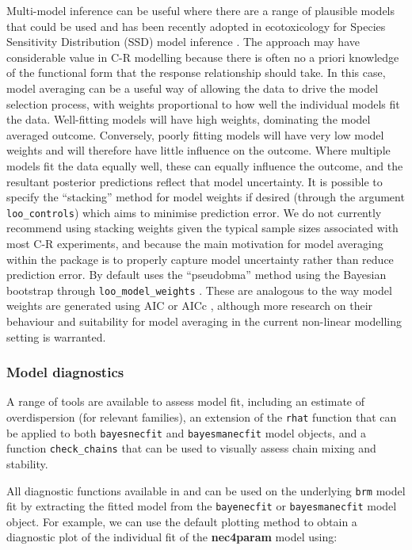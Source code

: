\documentclass[
]{jss}
\begin{document}
Multi-model inference can be useful where there are a range of plausible
models that could be used \citep{Burnham2002} and has been recently
adopted in ecotoxicology for Species Sensitivity Distribution (SSD)
model inference \citep{Thorley2018, fox2020, Dalgarno}. The approach may
have considerable value in C-R modelling because there is often no a
priori knowledge of the functional form that the response relationship
should take. In this case, model averaging can be a useful way of
allowing the data to drive the model selection process, with weights
proportional to how well the individual models fit the data.
Well-fitting models will have high weights, dominating the model
averaged outcome. Conversely, poorly fitting models will have very low
model weights and will therefore have little influence on the outcome.
Where multiple models fit the data equally well, these can equally
influence the outcome, and the resultant posterior predictions reflect
that model uncertainty. It is possible to specify the ``stacking''
method \citep{Yao2018} for model weights if desired (through the
argument \texttt{loo\_controls}) which aims to minimise prediction
error. We do not currently recommend using stacking weights given the
typical sample sizes associated with most C-R experiments, and because
the main motivation for model averaging within the 
package is to properly capture model uncertainty rather than reduce
prediction error. By default  uses the ``pseudobma''
method using the Bayesian bootstrap through \texttt{loo\_model\_weights}
\citep{vehtari2020, vehtari2017}. These are analogous to the way model
weights are generated using AIC or AICc \citep{Burnham2002}, although
more research on their behaviour and suitability for model averaging in
the current non-linear modelling setting is warranted.

\hypertarget{model-diagnostics}{%
\subsubsection{Model diagnostics}\label{model-diagnostics}}

A range of tools are available to assess model fit, including an
estimate of overdispersion (for relevant families), an extension of the
 \texttt{rhat} function that can be applied to both
\texttt{bayesnecfit} and \texttt{bayesmanecfit} model objects, and a
function \texttt{check\_chains} that can be used to visually assess
chain mixing and stability.

All diagnostic functions available in  and  can be
used on the underlying \texttt{brm} model fit by extracting the fitted
 model from the \texttt{bayenecfit} or \texttt{bayesmanecfit}
model object. For example, we can use the default  plotting
method to obtain a diagnostic plot of the individual fit of the
\textbf{nec4param} model using:
\end{document}
